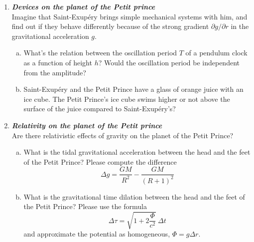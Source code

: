 \documentclass[a4paper,12pt]{article}
\newcommand{\question}[1]{\textbf{\textit{#1}}}
\begin{document}
\begin{enumerate}
\item \question{Devices on the planet of the Petit prince}\\
Imagine that Saint-Exup{\'e}ry brings simple mechanical systems with him, and find out if they behave differently because of the strong gradient $\partial g/\partial r$ in the gravitational acceleration $g$.
\begin{enumerate}[(a)]
\item{What's the relation between the oscillation period $T$ of a pendulum clock as a function of height $h$? Would the oscillation period be independent from the amplitude?}
\item{Saint-Exup{\'e}ry and the Petit Prince have a glass of orange juice
    with an ice cube. The Petit Prince's ice cube swims higher or not above the surface of the juice compared to Saint-Exup{\'e}ry's?}
\end{enumerate}

\item \question{Relativity on the planet of the Petit prince}\\
Are there relativistic effects of gravity on the planet of the Petit Prince?
\begin{enumerate}[(a)]
\item{What is the tidal gravitational acceleration between the head
    and the feet of the Petit Prince? Please compute the difference
\begin{equation}
\Delta g = \frac{GM}{R^2}-\frac{GM}{(R+1)^2} 
\end{equation}
}
\item{What is the gravitational time dilation between the head and the feet of the Petit Prince? Please use the formula
\begin{equation}
\Delta \tau = \sqrt{1+2\frac{\Phi}{c^2}}\:\Delta t
\end{equation}
and approximate the potential as homogeneous, $\Phi = g\Delta r$.
}
\end{enumerate}
\end{enumerate}
\end{document}
